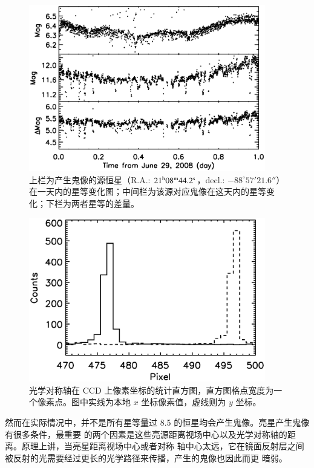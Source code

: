 \begin{figure}[h!]
\centering
\includegraphics[width=0.92\textwidth, trim={0.3cm 0.5cm 0 0}]{figures/chapter2/f6_starwghost.eps}
\caption{上栏为产生鬼像的源恒星（R.A.: $21^\mathrm{h}08^\mathrm{m}44.2^\mathrm{s}$，decl.: $-88^{\circ}57'21.6''$）在一天内的星等变化图；中间栏为该源对应鬼像在这天内的星等变化；下栏为两者星等的差量。}
\label{fig:starwghost}
\end{figure}

\begin{figure}[h!]
\centering
\includegraphics[width=0.92\textwidth,trim={0.5cm 0.5cm 0 0}]{figures/chapter2/f7_opticaxispix.eps}
\caption{光学对称轴在 CCD 上像素坐标的统计直方图，直方图格点宽度为一个像素点。图中实线为本地 $x$ 坐标像素值，虚线则为 $y$ 坐标。}
\label{fig:opticaxispix}
\end{figure}

然而在实际情况中，并不是所有星等量过 8.5 的恒星均会产生鬼像。亮星产生鬼像有很多条件，最重要
的两个因素是这些亮源距离视场中心以及光学对称轴的距离。原理上讲，当亮星距离视场中心或者对称
轴中心太远，它在镜面反射层之间被反射的光需要经过更长的光学路径来传播，产生的鬼像也因此而更
暗弱。



